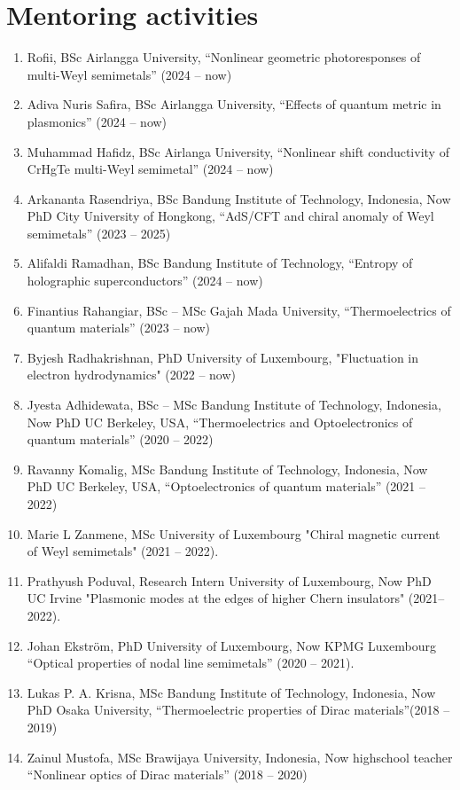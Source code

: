 \section*{Mentoring activities}
\begin{enumerate}
\item Rofii, BSc Airlangga University, ``Nonlinear geometric photoresponses of multi-Weyl semimetals'' (2024 -- now)
\item Adiva Nuris Safira, BSc Airlangga University, ``Effects of quantum metric in plasmonics'' (2024 -- now)
\item Muhammad Hafidz, BSc Airlanga University, ``Nonlinear shift conductivity of CrHgTe multi-Weyl semimetal'' (2024 -- now)
\item Arkananta Rasendriya, BSc Bandung Institute of Technology, Indonesia, Now PhD City University of Hongkong, ``AdS/CFT and chiral anomaly of Weyl semimetals'' (2023 -- 2025)
\item Alifaldi Ramadhan, BSc Bandung Institute of Technology, ``Entropy of holographic superconductors'' (2024 -- now) 
\item  Finantius Rahangiar, BSc -- MSc Gajah Mada University, ``Thermoelectrics of quantum materials'' (2023 -- now)   
\item Byjesh Radhakrishnan, PhD University of Luxembourg, "Fluctuation in electron hydrodynamics" (2022 -- now)
\item Jyesta Adhidewata, BSc -- MSc Bandung Institute of Technology, Indonesia, Now PhD UC Berkeley, USA, ``Thermoelectrics and Optoelectronics of quantum materials'' (2020 -- 2022)
\item Ravanny Komalig, MSc Bandung Institute of Technology, Indonesia, Now PhD UC Berkeley, USA, ``Optoelectronics of quantum materials'' (2021 -- 2022)
\item Marie L Zanmene, MSc University of Luxembourg "Chiral magnetic current of Weyl semimetals" (2021 -- 2022).
\item Prathyush Poduval, Research Intern  University of Luxembourg, Now PhD UC Irvine  "Plasmonic modes at the edges of higher Chern insulators" (2021-- 2022).
\item Johan Ekstr\"om, PhD  University of Luxembourg, Now KPMG Luxembourg ``Optical properties of nodal line semimetals'' (2020 -- 2021).
\item Lukas P. A. Krisna, MSc Bandung Institute of Technology, Indonesia, Now PhD Osaka University, ``Thermoelectric properties of Dirac materials''(2018 -- 2019)
\item Zainul Mustofa, MSc Brawijaya University, Indonesia, Now highschool teacher ``Nonlinear optics of Dirac materials'' (2018 -- 2020)

\end{enumerate}
